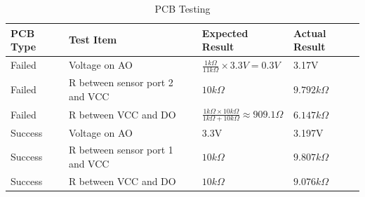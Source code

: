 \begin{table}[h]
        \centering
        \begin{tabular}{|l|l|l|l|}
            \hline
            \textbf{PCB Type} & \textbf{Test Item} & \textbf{Expected Result} & \textbf{Actual Result} \\ \hline
            Failed& Voltage on AO & $\frac{1k\Omega}{11k\Omega}\times 3.3V=0.3V$ & 3.17V \\ \hline
            Failed& R between sensor port 2 and VCC & $10k\Omega$ & $9.792k\Omega$ \\ \hline
            Failed& R between VCC and DO & $\frac{1k\Omega\times10k\Omega}{1k\Omega+10k\Omega}\approx 909.1 \Omega$ & $6.147k\Omega$ \\ \hline
            Success& Voltage on AO & 3.3V & 3.197V \\ \hline
            Success& R between sensor port 1 and VCC & $10k\Omega$ & $9.807k\Omega$ \\ \hline
            Success& R between VCC and DO & $10k\Omega$ & $9.076k \Omega$ \\ \hline
        \end{tabular}
        \caption{PCB Testing}
        \label{tab:pcb_testing}
    \end{table}   
